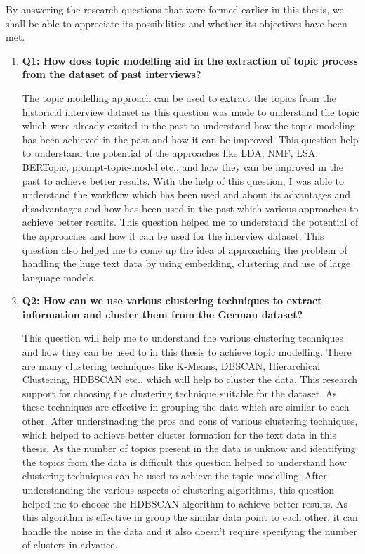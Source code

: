 By answering the research questions that were formed earlier in this thesis, we shall be able to appreciate its possibilities and whether its objectives have been met.
\begin{enumerate}
    \item\textbf{Q1: How does topic modelling aid in the extraction of topic process from the dataset of past interviews?}
    
    The topic modelling approach can be used to extract the topics from the historical interview dataset as this question was made to understand the topic which were already 
    exsited in the past to understand how the topic modeling has been achieved in the past and how it can be improved. This question help to understand the potential of the approaches
    like LDA, NMF, LSA, BERTopic, prompt-topic-model etc., and how they can be improved in the past to achieve better results. With the help of this question, I was able to understand 
    the workflow which has been used and about its advantages and disadvantages and how has been used in the past which various approaches to achieve better results. This question
    helped me to understand the potential of the approaches and how it can be used for the interview dataset. This question also helped me to come up the idea of approaching the 
    problem of handling the huge text data by using embedding, clustering and use of large language models.
    
    \vspace{0.3cm}
    \item\textbf{Q2: How can we use various clustering techniques to extract information and cluster them from the German dataset?}
    
    This question will help me to understand the various clustering techniques and how they can be used to in this thesis to achieve topic modelling. There are many clustering techniques
    like K-Means, DBSCAN, Hierarchical Clustering, HDBSCAN etc., which will help to cluster the data. This research support for choosing the clustering technique suitable for the dataset.
    As these techniques are effective in grouping the data which are similar to each other. After understnading the pros and cons of various clustering techniques, which helped to achieve
    better cluster formation for the text data in this thesis. As the number of topics present in the data is unknow and identifying the topics from the data is difficult this question helped
    to understand how clustering techniques can be used to achieve the topic modelling. After understanding the various aspects of clustering algorithms, this question helped me to choose
    the HDBSCAN algorithm to achieve better results. As this algorithm is effective in group the similar data point to each other, it can handle the noise in the data and it also doesn't 
    require specifying the number of clusters in advance.
    

\end{enumerate}

